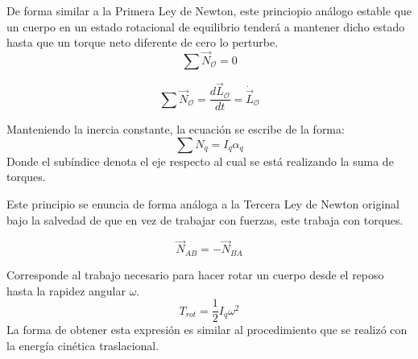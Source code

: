 \documentclass[/home/hernan/Documentos/Apuntes_mecanica_teorica/main.tex]{subfiles}
\begin{document}

	\begin{definition}
		De forma similar a la Primera Ley de Newton, este princiopio análogo estable que un cuerpo en un estado rotacional de equilibrio tenderá a mantener dicho estado hasta que un torque neto diferente de cero lo perturbe.
		\begin{equation}
			\sum \vec{N}_{\mathcal{O}} = 0
			\label{eq: Nfirstlawrot}
		\end{equation}
		
	\end{definition}

	\begin{definition}
		\begin{equation}
			\sum \vec{N}_{\mathcal{O}} = \frac{d \vec{L}_{\mathcal{O}}}{dt} = \dot{\vec{L}}_{\mathcal{O}}
			\label{eq: NSecondlawrot}
		\end{equation}

		Manteniendo la inercia constante, la ecuación se escribe de la forma:
		\begin{equation}
			\sum N_{q} = I_{q} \alpha_{q}
		\end{equation}
		Donde el subíndice denota el eje respecto al cual se está realizando la suma de torques.
	\end{definition}

	\newpage
	\begin{definition} 
		Este principio se enuncia de forma análoga a la Tercera Ley de Newton original bajo la salvedad de que en vez de trabajar con fuerzas, este trabaja con torques.

		\begin{equation}
			\vec{N}_{AB} = - \vec{N}_{BA}
			\label{eq: NThirdlawrot}
		\end{equation}
		
	\end{definition}

	\begin{definition}
		Corresponde al trabajo necesario para hacer rotar un cuerpo desde el reposo hasta la rapidez angular $\omega$.
		\begin{equation}
			T_{rot} = \frac{1}{2}I_{q}\omega^{2}
			\label{eq: Trot}
		\end{equation}
		La forma de obtener esta expresión es similar al procedimiento que se realizó con la energía cinética traslacional.
	\end{definition}
\end{document}
